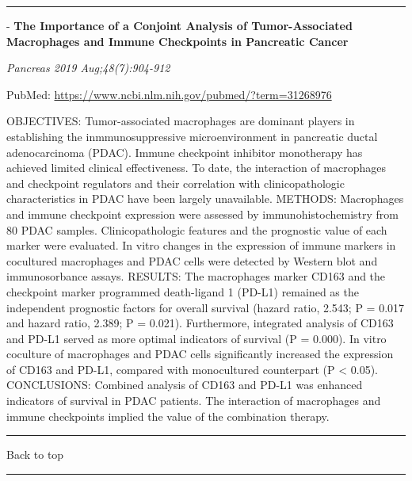 \documentclass[]{article}
\begin{document}
{}

{}

\begin{center}\rule{0.5\linewidth}{\linethickness}\end{center}

 - \textbf{The Importance of a Conjoint Analysis of Tumor-Associated
Macrophages and Immune Checkpoints in Pancreatic Cancer}

\emph{Pancreas 2019 Aug;48(7):904-912}

PubMed: \url{https://www.ncbi.nlm.nih.gov/pubmed/?term=31268976}

OBJECTIVES: Tumor-associated macrophages are dominant players in
establishing the inmmunosuppressive microenvironment in pancreatic
ductal adenocarcinoma (PDAC). Immune checkpoint inhibitor monotherapy
has achieved limited clinical effectiveness. To date, the interaction of
macrophages and checkpoint regulators and their correlation with
clinicopathologic characteristics in PDAC have been largely unavailable.
METHODS: Macrophages and immune checkpoint expression were assessed by
immunohistochemistry from 80 PDAC samples. Clinicopathologic features
and the prognostic value of each marker were evaluated. In vitro changes
in the expression of immune markers in cocultured macrophages and PDAC
cells were detected by Western blot and immunosorbance assays. RESULTS:
The macrophages marker CD163 and the checkpoint marker programmed
death-ligand 1 (PD-L1) remained as the independent prognostic factors
for overall survival (hazard ratio, 2.543; P = 0.017 and hazard ratio,
2.389; P = 0.021). Furthermore, integrated analysis of CD163 and PD-L1
served as more optimal indicators of survival (P = 0.000). In vitro
coculture of macrophages and PDAC cells significantly increased the
expression of CD163 and PD-L1, compared with monocultured counterpart (P
\textless{} 0.05). CONCLUSIONS: Combined analysis of CD163 and PD-L1 was
enhanced indicators of survival in PDAC patients. The interaction of
macrophages and immune checkpoints implied the value of the combination
therapy.

{}

{}

\begin{center}\rule{0.5\linewidth}{\linethickness}\end{center}

Back to top

\begin{center}\rule{0.5\linewidth}{\linethickness}\end{center}
\end{document}

